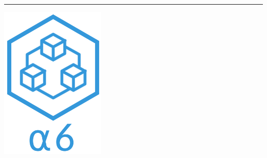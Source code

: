 \begin{center}

\begin{large} \textbf{\progetto} \end{large}
\vspace{0.2em}

\hrule
\vspace{7em}

\includegraphics[keepaspectratio = true, width=5cm]{../template/icons/sotto.png}

\thispagestyle{empty}

\vspace{1.5em}

\begin{center} 
  \begin{Huge}
  {\fontsize{15mm}{20mm}\selectfont \gruppoLink} 
  \end{Huge}
\end{center}

\vfill

\begin{Huge} \documento \end{Huge}


\end{center}
